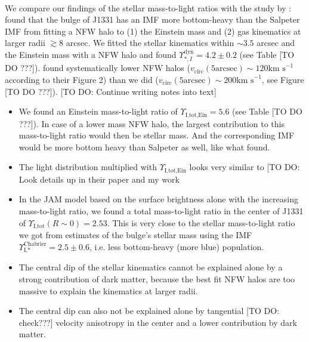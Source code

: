 \\We compare our findings of the stellar mass-to-light ratios with the study by \cite{SWELLSV}: \cite{SWELLSV} found that the bulge of J1331 has an IMF more bottom-heavy than the Salpeter IMF from fitting a NFW halo to (1) the Einstein mass and (2) gas kinematics at larger radii $\gtrsim 8$ arcsec. We fitted the stellar kinematics within $\sim 3.5$ arcsec and the Einstein mass with a NFW halo and found $\Upsilon^\text{dyn}_{*,I} = 4.2 \pm 0.2$ (see Table [TO DO ???]). \cite{SWELLSV}  found systematically lower NFW halos ($v_\text{circ}(5\text{arcsec}) \sim 120 \text{km s}^{-1}$ according to their Figure 2) than we did ($v_\text{circ}(5\text{arcsec}) \sim 200 \text{km s}^{-1}$, see Figure [TO DO ???]). [TO DO: Continue writing notes into text]
\begin{itemize}
\item We found an Einstein mass-to-light ratio of $\Upsilon_\text{I,tot,Ein} = 5.6$ (see Table [TO DO ???]). In case of a lower mass NFW halo, the largest contribution to this mass-to-light ratio would then be stellar mass. And the corresponding IMF would be more bottom heavy than Salpeter as well, like what \citet{SWELLSV} found.
\item The light distribution multiplied with $\Upsilon_\text{I,tot,Ein}$ looks very similar to \cite{SWELLSV} [TO DO: Look details up in their paper and my work
\item In the JAM model based on the surface brightness alone with the increasing mass-to-light ratio, we found a total mass-to-light ratio in the center of J1331 of  $\Upsilon_\text{I,tot}(R\sim0) = 2.53$. This is very close to the stellar mass-to-light ratio we got from \citet{SWELLSI} estimates of the bulge's stellar mass using the \citet{Chabrier2003} IMF $\Upsilon_\text{I,*}^\text{Chabrier} = 2.5 \pm 0.6$, i.e. less bottom-heavy (more blue) population.
\item The central dip of the stellar kinematics cannot be explained alone by a strong contribution of dark matter, because the best fit NFW halos are too massive to explain the kinematics at larger radii.
\item The central dip can also not be explained alone by tangential [TO DO: check???] velocity anisotropy in the center and a lower contribution by dark matter.

\end{itemize}
